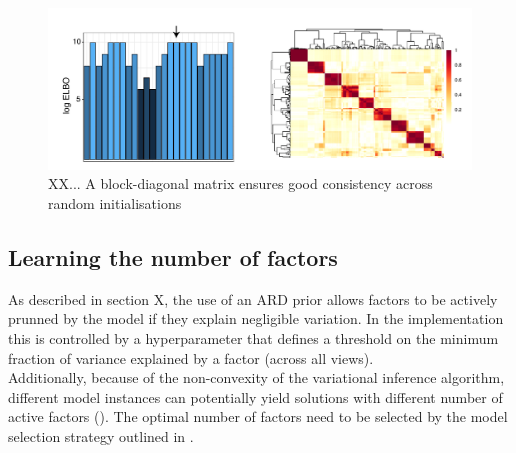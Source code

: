 \begin{figure}[H]
	\centering 	
	\includegraphics[width=1.0\textwidth]{MOFA_robustness}
	\caption{XX... A block-diagonal matrix ensures good consistency across random initialisations}
	\label{fig:MOFA_robustness}
\end{figure}







\subsection{Learning the number of factors} \label{section:number_factors}
As described in section X, the use of an ARD prior allows factors to be actively prunned by the model if they explain negligible variation. In the implementation this is controlled by a hyperparameter that defines a threshold on the minimum fraction of variance explained by a factor (across all views).\\
Additionally, because of the non-convexity of the variational inference algorithm, different model instances can potentially yield solutions with different number of active factors (). The optimal number of factors need to be selected by the model selection strategy outlined in .

